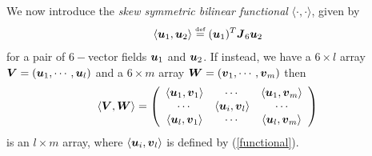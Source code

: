 We now introduce  the {\em skew symmetric bilinear functional\/} 
$\langle \cdot , \cdot \rangle$, given by
\begin{equation} \label{functional}
\langle {\bmi  u}_{1} , {\bmi  u}_{2} \rangle \stackrel{\mbox{\tiny def}}{=}
({\bmi  u}_{1})^{ T} {\bmi  J}_6 {\bmi  u}_{2}
\end{equation}
for a pair of $6-$vector fields ${\bmi  u}_{1}$ and ${\bmi  
u}_{2}$.
If instead, we have a $6\times l$ array
${\bmi V}=({\bmi u}_{1}  ,\cdots,  {\bmi u}_{l})$ and a $6\times m$ array
${\bmi W}=({\bmi v}_{1}  ,\cdots,  {\bmi v}_{m})$
then
\begin{equation} \label{functionalnm}
\langle {\bmi V} , {\bmi W}
\rangle= 
\left(
\begin{array}{ccc}
\langle {\bmi u}_{1},  {\bmi v}_{1} \rangle&\cdots&\langle {\bmi u}_{1},  {\bmi
v}_{m} \rangle\\
\cdots&\langle {\bmi u}_{i},  {\bmi v}_{l} \rangle&\cdots\\
\langle {\bmi u}_{l},  {\bmi v}_{1} \rangle&\cdots&\langle {\bmi u}_{l},  {\bmi
v}_{m} \rangle
\end{array}
\right)
\end{equation}
is an $l \times m$ array, where $\langle {\bmi u}_{i},  {\bmi v}_{l} 
\rangle$ is defined by (\ref{functional}). 

